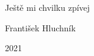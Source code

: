 \vspace*{5cm}
\begin{center}
\begin{Huge}
	\selectfont
	Ještě mi chvilku zpívej
\end{Huge}
\vspace{1cm}

\begin{Large}
František Hluchník
\vspace{4mm}

2021
\end{Large}
\end{center}
\newpage
